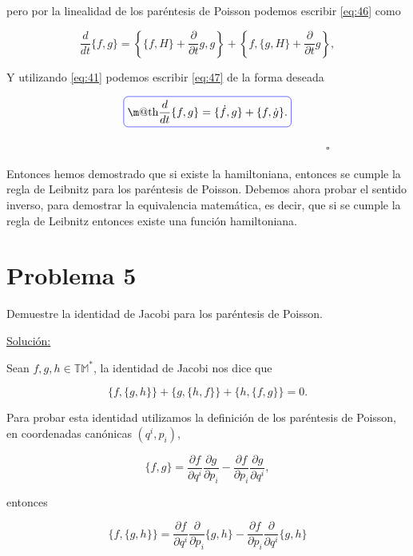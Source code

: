 \documentclass[a4paper,10pt]{article}
\makeatletter
\numberwithin{equation}{section}
\newcommand*{\boxcolor}{blue}
\renewcommand{\boxed}[1]{\textcolor{\boxcolor}{%
\tikz[baseline={([yshift=-1ex]current bounding box.center)}] \node [rectangle, minimum width=1ex,rounded corners,draw] {\normalcolor\m@th$\displaystyle#1$};}}
\makeatother
\begin{document}
pero por la linealidad de los paréntesis de Poisson podemos escribir \eqref{eq:46} como

\begin{equation}
  \frac{d}{dt}\{f,g\} = \left\{\{f,H\} + \frac{\partial}{\partial t}g, g\right\} + 
  \left\{f,\{g,H\} + \frac{\partial}{\partial t}g\right\},
  \label{eq:47}
\end{equation}

Y utilizando \eqref{eq:41} podemos escribir \eqref{eq:47} de la forma deseada

\begin{equation}
 \boxed{\frac{d}{dt}\{f,g\} = \{\dot{f},g\} + \{f,\dot{g}\}.}
\end{equation}

$\hspace{12cm} \square$

Entonces hemos demostrado que si existe la hamiltoniana, entonces se cumple la regla 
de Leibnitz para los paréntesis de Poisson. Debemos ahora probar el sentido inverso, 
para demostrar la equivalencia matemática, es decir, que si se cumple la regla de 
Leibnitz entonces existe una función hamiltoniana.


\section{Problema 5}

Demuestre la identidad de Jacobi para los paréntesis de Poisson.

\vspace{.3cm}

\underline{Solución:} \vspace{.3cm}

Sean $f,g,h \in \mathbb{TM}^*$, la identidad de Jacobi nos dice que 

\begin{equation}
 \{f,\{g,h\}\} + \{g,\{h,f\}\} + \{h,\{f,g\}\} = 0.
\end{equation}

Para probar esta identidad utilizamos la definición de los paréntesis de Poisson, 
en coordenadas canónicas $(q^i,p_i)$, 

\begin{equation}
 \{f,g\} = \frac{\partial f}{\partial q^i}\frac{\partial g}{\partial p_i} - 
 \frac{\partial f}{\partial p_i}\frac{\partial g}{\partial q^i},
\end{equation}

entonces 

\begin{equation}
  \{f,\{g,h\}\} = \frac{\partial f}{\partial q^i}\frac{\partial }{\partial p_i}\{g,h\} - 
 \frac{\partial f}{\partial p_i}\frac{\partial }{\partial q^i}\{g,h\} 
\end{equation}
\end{document}
